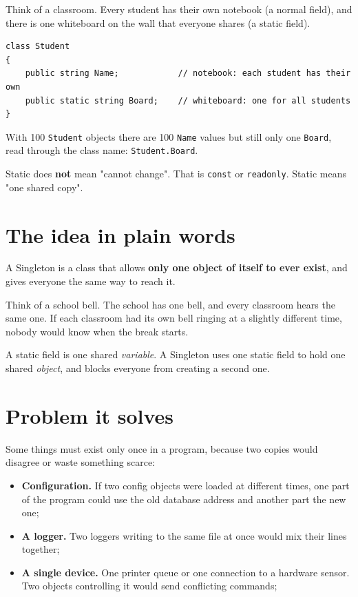 \documentclass{utmreport}
\providecommand{\tightlist}{\setlength{\itemsep}{0pt}\setlength{\parskip}{0pt}}
\providecommand{\passthrough}[1]{#1}
\begin{document}
Think of a classroom. Every student has their own notebook (a normal field), and there is one whiteboard on the wall that everyone shares (a static field).

\begin{lstlisting}
class Student
{
    public string Name;            // notebook: each student has their own
    public static string Board;    // whiteboard: one for all students
}
\end{lstlisting}

With 100 \passthrough{\lstinline!Student!} objects there are 100 \passthrough{\lstinline!Name!} values but still only one \passthrough{\lstinline!Board!}, read through the class name: \passthrough{\lstinline!Student.Board!}.

Static does \textbf{not} mean "cannot change". That is \passthrough{\lstinline!const!} or \passthrough{\lstinline!readonly!}. Static means "one shared copy".

\section{The idea in plain words}

A Singleton is a class that allows \textbf{only one object of itself to ever exist}, and gives everyone the same way to reach it.

Think of a school bell. The school has one bell, and every classroom hears the same one. If each classroom had its own bell ringing at a slightly different time, nobody would know when the break starts.

A static field is one shared \emph{variable}. A Singleton uses one static field to hold one shared \emph{object}, and blocks everyone from creating a second one.

\section{Problem it solves}

Some things must exist only once in a program, because two copies would disagree or waste something scarce:

\begin{itemize}
\tightlist
\item \textbf{Configuration.} If two config objects were loaded at different times, one part of the program could use the old database address and another part the new one;
\item \textbf{A logger.} Two loggers writing to the same file at once would mix their lines together;
\item \textbf{A single device.} One printer queue or one connection to a hardware sensor. Two objects controlling it would send conflicting commands;
\end{itemize}
\end{document}
